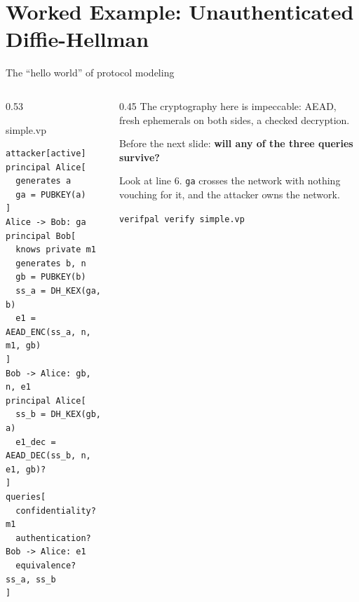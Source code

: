 \ifdefined\PRESENTATION\else\PassOptionsToClass{handout}{beamer}\fi\documentclass[aspectratio=169, lualatex]{beamer}
\newcommand{\vpcode}{\fontsize{6}{6.4}\selectfont\ttfamily\color{vpink}}
\begin{document}
\section{Worked Example: Unauthenticated Diffie-Hellman}

\begin{frame}[fragile]{The ``hello world'' of protocol modeling}
	\begin{columns}[t]
		\begin{column}{0.53\textwidth}
			\begin{vpmodel}[top=0.5mm, bottom=0.5mm]{simple.vp}
				\begin{lstlisting}[basicstyle=\vpcode]
attacker[active]
principal Alice[
  generates a
  ga = PUBKEY(a)
]
Alice -> Bob: ga
principal Bob[
  knows private m1
  generates b, n
  gb = PUBKEY(b)
  ss_a = DH_KEX(ga, b)
  e1 = AEAD_ENC(ss_a, n, m1, gb)
]
Bob -> Alice: gb, n, e1
principal Alice[
  ss_b = DH_KEX(gb, a)
  e1_dec = AEAD_DEC(ss_b, n, e1, gb)?
]
queries[
  confidentiality? m1
  authentication? Bob -> Alice: e1
  equivalence? ss_a, ss_b
]
\end{lstlisting}
			\end{vpmodel}
		\end{column}
		\begin{column}{0.45\textwidth}
			\vspace{0.3em}
			The cryptography here is impeccable: AEAD, fresh ephemerals on both sides, a checked decryption.
			\vspace{0.5em}

			Before the next slide: \textbf{will any of the three queries survive?}
			\vspace{0.5em}

			Look at line 6. \texttt{ga} crosses the network with nothing vouching for it, and the attacker owns the network.
			\vspace{0.5em}

			\begin{center}
				\texttt{verifpal verify simple.vp}
			\end{center}
		\end{column}
	\end{columns}
\end{frame}
\end{document}
